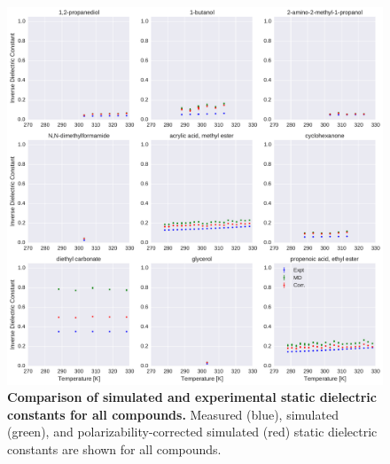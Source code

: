 \documentclass[aps,pre,twocolumn,nofootinbib,superscriptaddress,linenumbers]{revtex4-1}
\begin{document}
\begin{figure}[alldielectric]

\includegraphics[width=\textwidth]{./figures/dielectric_versus_temperature_part0.pdf}

\caption{{\bf Comparison of simulated and experimental static dielectric constants for all compounds.}
Measured (blue), simulated (green), and polarizability-corrected simulated (red) static dielectric constants are shown for all compounds.
}

\label{figure:AllDielectrics}

\end{figure}
\end{document}
